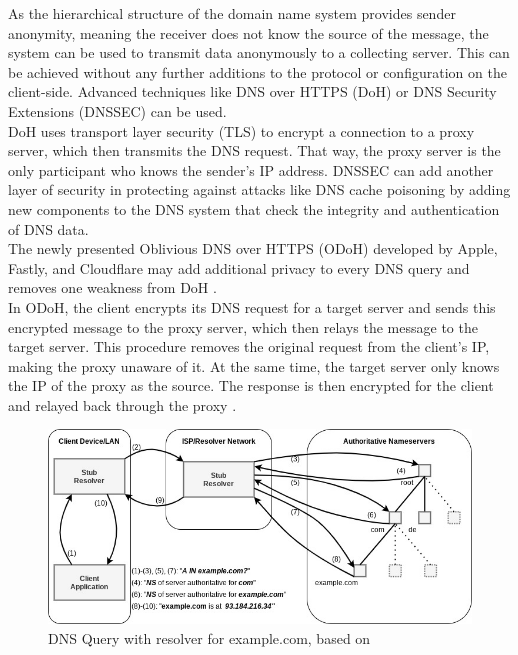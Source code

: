         
        As the hierarchical structure of the domain name system provides sender anonymity, meaning the receiver does not know the source of the message, the system can be used to transmit data anonymously to a collecting server. This can be achieved without any further additions to the protocol or configuration on the client-side.
        Advanced techniques like DNS over HTTPS (DoH) \cite{ermert_cloudflare_2020} \cite{mcmanus_dns_2018} or DNS Security Extensions (DNSSEC) \cite{larson_dns_2005} can be used.\\
        DoH uses transport layer security (TLS) to encrypt a connection to a proxy server, which then transmits the DNS request. That way, the proxy server is the only participant who knows the sender's IP address. DNSSEC can add another layer of security in protecting against attacks like DNS cache poisoning by adding new components to the DNS system that check the integrity and authentication of DNS data.\\
        The newly presented Oblivious DNS over HTTPS (ODoH) developed by Apple, Fastly, and Cloudflare may add additional privacy to every DNS query and removes one weakness from DoH \cite{verma_improving_2020}.\\
        In ODoH, the client encrypts its DNS request for a target server and sends this encrypted message to the proxy server, which then relays the message to the target server. This procedure removes the original request from the client's IP, making the proxy unaware of it.
        At the same time, the target server only knows the IP of the proxy as the source. The response is then encrypted for the client and relayed back through the proxy \cite{verma_improving_2020}.
        
        \begin{figure}
            \centering
            \includegraphics[width=\textwidth]{latex/figures/dns_resolve.jpg}
            \caption[DNS Query with resolver for example.com]{DNS Query with resolver for example.com, based on \cite{friedewald_privacy_2018}}
            \label{fig:dns_query}
        \end{figure}
        
